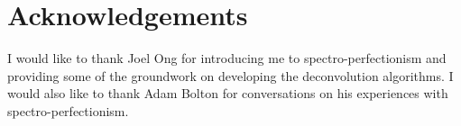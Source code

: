 \section*{Acknowledgements}

I would like to thank Joel Ong for introducing me to spectro-perfectionism and providing some of the groundwork on developing the deconvolution algorithms. I would also like to thank Adam Bolton for conversations on his experiences with spectro-perfectionism.